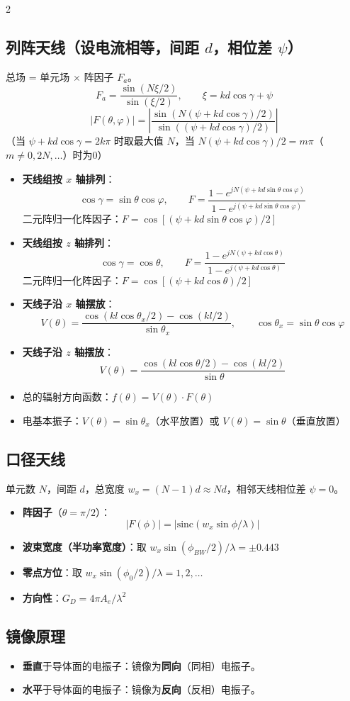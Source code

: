\documentclass[10pt,a4paper,landscape]{article}
\begin{document}
\begin{multicols}{2}
\subsection{列阵天线（设电流相等，间距 $d$，相位差 $\psi$）}
总场 = 单元场 $\times$ 阵因子 $F_a$。
\[
F_a = \frac{\sin(N\xi/2)}{\sin(\xi/2)}, \qquad \xi = kd\cos\gamma + \psi
\]
\[
|F(\theta,\varphi)| = \left|\frac{\sin(N(\psi + kd\cos\gamma)/2)}{\sin((\psi + kd\cos\gamma)/2)}\right|
\]
（当 $\psi + kd\cos\gamma = 2k\pi$ 时取最大值 $N$，当 $N(\psi + kd\cos\gamma)/2 = m\pi$（$m\neq 0,2N,\dots$）时为0）

\begin{itemize}
    \item \textbf{天线组按 $x$ 轴排列}：
    \[
    \cos\gamma = \sin\theta\cos\varphi, \qquad F = \frac{1 - e^{jN(\psi + kd\sin\theta\cos\varphi)}}{1 - e^{j(\psi + kd\sin\theta\cos\varphi)}}
    \]
    二元阵归一化阵因子：$F = \cos[(\psi + kd\sin\theta\cos\varphi)/2]$
    \item \textbf{天线组按 $z$ 轴排列}：
    \[
    \cos\gamma = \cos\theta, \qquad F = \frac{1 - e^{jN(\psi + kd\cos\theta)}}{1 - e^{j(\psi + kd\cos\theta)}}
    \]
    二元阵归一化阵因子：$F = \cos[(\psi + kd\cos\theta)/2]$
    \item \textbf{天线子沿 $x$ 轴摆放}：
    \[
    V(\theta) = \frac{\cos(kl\cos\theta_x/2) - \cos(kl/2)}{\sin\theta_x}, \qquad \cos\theta_x = \sin\theta\cos\varphi
    \]
    \item \textbf{天线子沿 $z$ 轴摆放}：
    \[
    V(\theta) = \frac{\cos(kl\cos\theta/2) - \cos(kl/2)}{\sin\theta}
    \]
    \item 总的辐射方向函数：$f(\theta) = V(\theta)\cdot F(\theta)$
    \item 电基本振子：$V(\theta) = \sin\theta_x$（水平放置）或 $V(\theta) = \sin\theta$（垂直放置）
\end{itemize}

\subsection{口径天线}
单元数 $N$，间距 $d$，总宽度 $w_x = (N-1)d \approx Nd$，相邻天线相位差 $\psi = 0$。
\begin{itemize}
    \item \textbf{阵因子}（$\theta = \pi/2$）：
    \[
    |F(\phi)| = |\text{sinc}(w_x\sin\phi/\lambda)|
    \]
    \item \textbf{波束宽度（半功率宽度）}：取 $w_x\sin(\phi_{BW}/2)/\lambda = \pm 0.443$
    \item \textbf{零点方位}：取 $w_x\sin(\phi_0/2)/\lambda = 1,2,\dots$
    \item \textbf{方向性}：$G_D = 4\pi A_e/\lambda^2$
\end{itemize}

\subsection{镜像原理}
\begin{itemize}
    \item \textbf{垂直}于导体面的电振子：镜像为\textbf{同向}（同相）电振子。
    \item \textbf{水平}于导体面的电振子：镜像为\textbf{反向}（反相）电振子。
\end{itemize}

\end{multicols}
\end{document}
